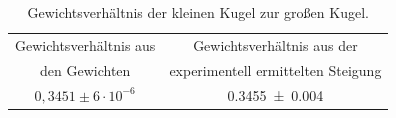 \begin{table}[h]
	\caption{Gewichtsverhältnis der kleinen Kugel zur großen Kugel. }
	\begin{tabular}{|c|c|}
		\hline
		Gewichtsverhältnis aus  & Gewichtsverhältnis aus der\\
		 den Gewichten &  experimentell ermittelten Steigung\\
		\hline
		$0,3451 \pm 6 \cdot 10^{-6}$& \SI{0,3455+-0,004}{}\\
		\hline
	\end{tabular}
	\label{tab:Gewicht}
\end{table}
